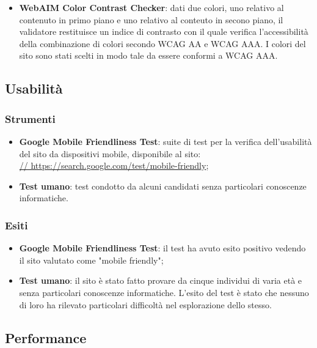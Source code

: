\documentclass[12pt]{article}
\begin{document}
\begin{itemize}
		\item \textbf{WebAIM Color Contrast Checker}: dati due colori, uno relativo al contenuto in primo piano e uno relativo al conteuto in secono piano, il validatore restituisce un indice di contrasto con il quale verifica l'accessibilità della combinazione di colori secondo WCAG AA e WCAG AAA. I colori del sito sono stati scelti in modo tale da essere conformi a WCAG AAA. 
	\end{itemize}
	
	\subsection{Usabilità}
	
	\subsubsection{Strumenti}
	
	\begin{itemize}
		\item \textbf{Google Mobile Friendliness Test}: suite di test per la verifica dell'usabilità del sito da dispositivi mobile, disponibile al sito:
		\\ \url{// https://search.google.com/test/mobile-friendly};
		
		\item \textbf{Test umano}: test condotto da alcuni candidati senza particolari conoscenze informatiche.
	\end{itemize}

	\subsubsection{Esiti}
	
	\begin{itemize}
		\item \textbf{Google Mobile Friendliness Test}: il test ha avuto esito positivo vedendo il sito valutato come "mobile friendly";
		
		\item \textbf{Test umano}: il sito è stato fatto provare da cinque individui di varia età e senza particolari conoscenze informatiche. L'esito del test è stato che nessuno di loro ha rilevato particolari difficoltà nel esplorazione dello stesso. 
	\end{itemize}
	
	\subsection{Performance}
	
\end{document}
